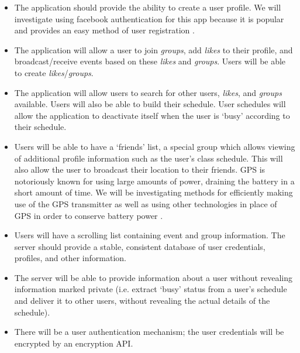 \documentclass[11pt]{article}
\begin{document}
\begin{itemize}
\item The application should provide the ability to create a user profile. 
    We will investigate using facebook authentication 
for this app because it is popular and provides an easy method of user registration \cite{capstone_facebook}.

\item The application will allow a user to join \textit{groups}, add \textit{likes} to 
    their profile, and broadcast/receive events based on these \textit{likes} and \textit{groups}. 
Users will be able to create \textit{likes}/\textit{groups}.

\item The application will allow users to search for other users, \textit{likes}, and \textit{groups}
    available. Users will also be able to build their schedule. User schedules
    will allow the application to deactivate itself when the user is `busy' 
    according to their schedule.

\item Users will be able to have a `friends' list, a special group which allows 
viewing of additional profile information such as the user's class
schedule. This will also allow the user to broadcast their location to their 
friends. GPS is notoriously known for using large amounts 
of power, draining the battery in a short amount of time. We will be investigating
methods for efficiently making use of the GPS transmitter as well as using 
other technologies in place of GPS in order to conserve battery power \cite{conserve_gps} \cite{gps_alternatives}.

\item  Users will have a scrolling list containing event and group information. 
The server should provide a stable, consistent database of user credentials, 
profiles, and other information.

\item The server will be able to provide information about a user without revealing 
information marked private (i.e. extract `busy' status from a user's schedule and 
deliver it to other users, 
without revealing the actual details of the schedule).

\item There will be a user authentication mechanism; the user credentials will 
be encrypted by an encryption API.
\end{itemize}
\end{document}
